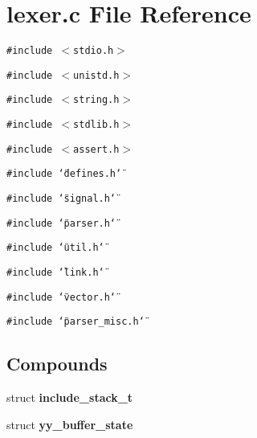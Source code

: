 \section{lexer.c File Reference}
\label{lexer_8c}
{\tt \#include $<$stdio.h$>$}\par
{\tt \#include $<$unistd.h$>$}\par
{\tt \#include $<$string.h$>$}\par
{\tt \#include $<$stdlib.h$>$}\par
{\tt \#include $<$assert.h$>$}\par
{\tt \#include \char`\"{}defines.h\char`\"{}}\par
{\tt \#include \char`\"{}signal.h\char`\"{}}\par
{\tt \#include \char`\"{}parser.h\char`\"{}}\par
{\tt \#include \char`\"{}util.h\char`\"{}}\par
{\tt \#include \char`\"{}link.h\char`\"{}}\par
{\tt \#include \char`\"{}vector.h\char`\"{}}\par
{\tt \#include \char`\"{}parser\_\-misc.h\char`\"{}}\par
\subsection*{Compounds}
\begin{CompactItemize}
\item 
struct {\bf include\_\-stack\_\-t}
\item 
struct {\bf yy\_\-buffer\_\-state}
\end{CompactItemize}
